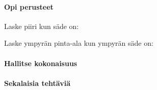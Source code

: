 



\begin{tehtavasivu}

\paragraph*{Opi perusteet}

\begin{tehtava}
Laske piiri kun säde on:
\begin{alakohdat}
\end{alakohdat}
\begin{vastaus}
\begin{alakohdat}
\end{alakohdat}
\end{vastaus}
\end{tehtava}

\begin{tehtava}
Laske ympyrän pinta-ala kun ympyrän säde on:
\begin{alakohdat}
\end{alakohdat}

\begin{vastaus}
\begin{alakohdat}
\end{alakohdat}
\end{vastaus}
\end{tehtava}


\paragraph*{Hallitse kokonaisuus}

\paragraph*{Sekalaisia tehtäviä}

\end{tehtavasivu}
